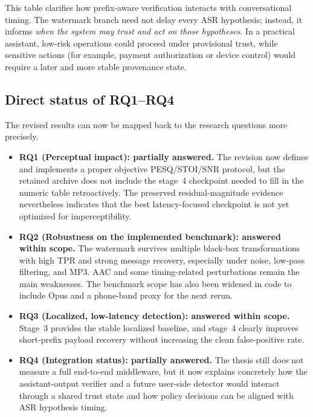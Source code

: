 This table clarifies how prefix-aware verification interacts with conversational timing. The watermark branch need not delay every ASR hypothesis; instead, it informs \emph{when the system may trust and act on those hypotheses}. In a practical assistant, low-risk operations could proceed under provisional trust, while sensitive actions (for example, payment authorization or device control) would require a later and more stable provenance state.

\subsection{Direct status of RQ1--RQ4}
The revised results can now be mapped back to the research questions more precisely.
\begin{itemize}[leftmargin=1.25em]
  \item \textbf{RQ1 (Perceptual impact): partially answered.} The revision now defines and implements a proper objective PESQ/STOI/SNR protocol, but the retained archive does not include the stage~4 checkpoint needed to fill in the numeric table retroactively. The preserved residual-magnitude evidence nevertheless indicates that the best latency-focused checkpoint is not yet optimized for imperceptibility.
  \item \textbf{RQ2 (Robustness on the implemented benchmark): answered within scope.} The watermark survives multiple black-box transformations with high TPR and strong message recovery, especially under noise, low-pass filtering, and MP3. AAC and some timing-related perturbations remain the main weaknesses. The benchmark scope has also been widened in code to include Opus and a phone-band proxy for the next rerun.
  \item \textbf{RQ3 (Localized, low-latency detection): answered within scope.} Stage~3 provides the stable localized baseline, and stage~4 clearly improves short-prefix payload recovery without increasing the clean false-positive rate.
  \item \textbf{RQ4 (Integration status): partially answered.} The thesis still does not measure a full end-to-end middleware, but it now explains concretely how the assistant-output verifier and a future user-side detector would interact through a shared trust state and how policy decisions can be aligned with ASR hypothesis timing.
\end{itemize}


